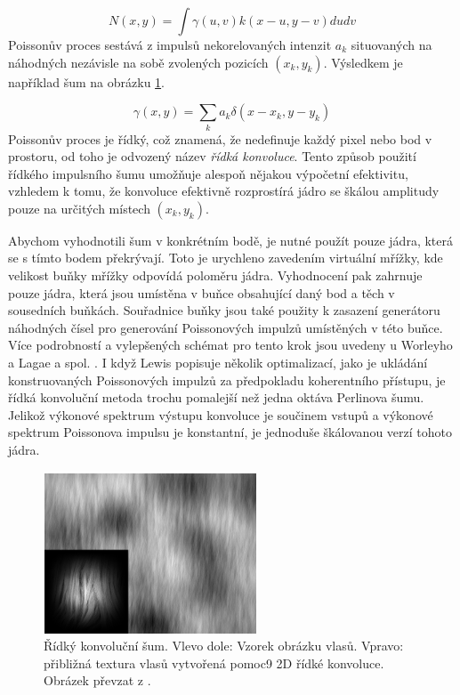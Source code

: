 \begin{equation}
	N(x,y) = \int\gamma(u,v)k(x-u,y-v)dudv
\end{equation}
Poissonův proces sestává z impulsů nekorelovaných intenzit $a_k$ situovaných na náhodných nezávisle na sobě zvolených pozicích $(x_k,y_k)$. Výsledkem je například šum na obrázku \ref{fig:SparseConvolutionNoise}.

\begin{equation}
	\gamma(x,y) = \sum_k a_k \delta(x-x_k,y-y_k)
\end{equation}
Poissonův proces je řídký, což znamená, že nedefinuje každý pixel nebo bod v prostoru, od toho je odvozený název \textit{řídká konvoluce}. Tento způsob použití řídkého impulsního šumu umožňuje alespoň nějakou výpočetní efektivitu, vzhledem k tomu, že konvoluce efektivně rozprostírá jádro se škálou amplitudy pouze na určitých místech $(x_k, y_k)$.

Abychom vyhodnotili šum v konkrétním bodě, je nutné použít pouze jádra, která se s tímto bodem překrývají. Toto je urychleno zavedením virtuální mřížky, kde velikost buňky mřížky odpovídá poloměru jádra. Vyhodnocení pak zahrnuje pouze jádra, která jsou umístěna v buňce obsahující daný bod a těch v sousedních buňkách. Souřadnice buňky jsou také použity k zasazení generátoru náhodných čísel pro generování Poissonových impulzů umístěných v této buňce. Více podrobností a vylepšených schémat pro tento krok jsou uvedeny u Worleyho \cite{worley1996} a Lagae a spol. \cite{Lagae09}. I když Lewis \cite{Lewis89} popisuje několik optimalizací, jako je ukládání konstruovaných Poissonových impulzů za předpokladu koherentního přístupu, je řídká konvoluční metoda trochu pomalejší než jedna oktáva Perlinova šumu. Jelikož výkonové spektrum výstupu konvoluce je součinem vstupů a výkonové spektrum Poissonova impulsu je konstantní, je jednoduše škálovanou verzí tohoto jádra.

\begin{figure}[H]
	\centering
	\includegraphics[scale=1]{obrazky-figures/SparseConvolutionNoise.png}
	\caption{Řídký konvoluční šum. Vlevo dole: Vzorek obrázku vlasů. Vpravo: přibližná textura vlasů vytvořená pomoc9 2D řídké konvoluce. Obrázek převzat z \cite{Lagae10}.}
	\label{fig:SparseConvolutionNoise}
\end{figure}

